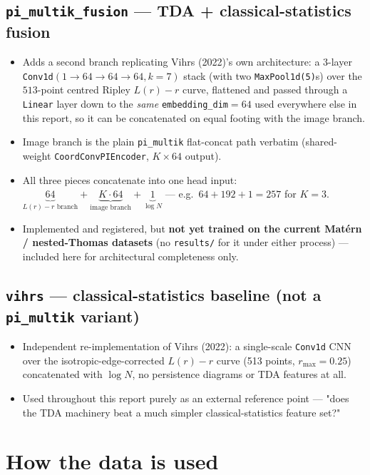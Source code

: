 \documentclass[11pt]{article}
\begin{document}
\subsection{\texttt{pi\_multik\_fusion} --- TDA + classical-statistics fusion}
\begin{itemize}
  \item Adds a second branch replicating Vihrs (2022)'s own architecture: a
    3-layer \texttt{Conv1d}$(1\to64\to64\to64, k{=}7)$ stack (with two
    \texttt{MaxPool1d(5)}s) over the $513$-point centred Ripley $L(r)-r$
    curve, flattened and passed through a \texttt{Linear} layer down to the
    \emph{same} \texttt{embedding\_dim}$=64$ used everywhere else in this
    report, so it can be concatenated on equal footing with the image branch.
  \item Image branch is the plain \texttt{pi\_multik} flat-concat path verbatim
    (shared-weight \texttt{CoordConvPIEncoder}, $K\times64$ output).
  \item All three pieces concatenate into one head input:
    $\underbrace{64}_{L(r)-r\text{ branch}} + \underbrace{K\cdot64}_{\text{image branch}} + \underbrace{1}_{\log N}$
    — e.g.\ $64+192+1=257$ for $K=3$.
  \item Implemented and registered, but \textbf{not yet trained on the current
    Matérn / nested-Thomas datasets} (no \texttt{results/} for it under either
    process) — included here for architectural completeness only.
\end{itemize}

\subsection{\texttt{vihrs} --- classical-statistics baseline (not a \texttt{pi\_multik} variant)}
\begin{itemize}
  \item Independent re-implementation of Vihrs (2022): a single-scale
    \texttt{Conv1d} CNN over the isotropic-edge-corrected $L(r)-r$ curve
    (513 points, $r_{\max}=0.25$) concatenated with $\log N$, no persistence
    diagrams or TDA features at all.
  \item Used throughout this report purely as an external reference point — "does
    the TDA machinery beat a much simpler classical-statistics feature set?"
\end{itemize}

\section{How the data is used}
\end{document}
